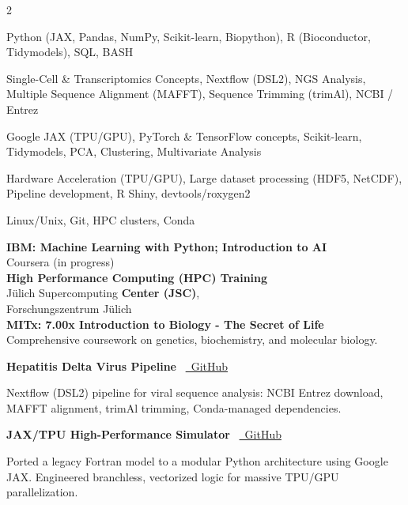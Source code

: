 \documentclass{thejus_cv}
\begin{document}
\begin{paracol}{2}

         {Python (JAX, Pandas, NumPy, Scikit-learn, Biopython), R (Bioconductor, Tidymodels), SQL, BASH}

         {Single-Cell \& Transcriptomics Concepts, Nextflow (DSL2), NGS Analysis, Multiple Sequence Alignment (MAFFT), Sequence Trimming (trimAl), NCBI / Entrez}

         {Google JAX (TPU/GPU), PyTorch \& TensorFlow concepts, Scikit-learn, Tidymodels, PCA, Clustering, Multivariate Analysis}

         {Hardware Acceleration (TPU/GPU), Large dataset processing (HDF5, NetCDF), Pipeline development, R Shiny, devtools/roxygen2}

         {Linux/Unix, Git, HPC clusters, Conda}



\textbf{IBM: Machine Learning with Python; Introduction to AI}\\
{\small Coursera (in progress)}\\[0.3cm]

\textbf{High Performance Computing (HPC) Training}\\
J\"ulich Supercomputing \textbf{Center (JSC)},\\
Forschungszentrum J\"ulich\\[0.3cm]

\textbf{MITx: 7.00x Introduction to Biology - The Secret of Life}\\
{\small Comprehensive coursework on genetics, biochemistry, and molecular biology.}\\[0.4cm]


\textbf{Hepatitis Delta Virus Pipeline} \textbullet\ \href{https://github.com/thejusmahajan/hepatitis-delta-pipeline}{\faGithub\ GitHub}\par
{\small Nextflow (DSL2) pipeline for viral sequence analysis: NCBI Entrez download, MAFFT alignment, trimAl trimming, Conda-managed dependencies.}\par
\vspace{0.3em}

\textbf{JAX/TPU High-Performance Simulator} \textbullet\ \href{https://github.com/thejusmahajan/Agent_Based_Phytoplankton_Model-IBM-Phytoplankton}{\faGithub\ GitHub}\par
{\small Ported a legacy Fortran model to a modular Python architecture using Google JAX. Engineered branchless, vectorized logic for massive TPU/GPU parallelization.}\par
\vspace{0.3em}


\end{paracol}
\end{document}
